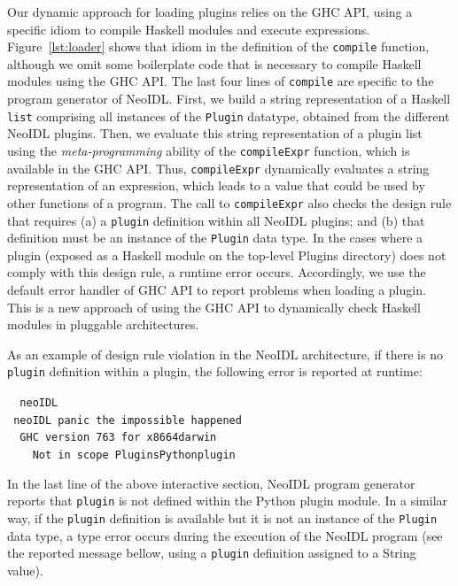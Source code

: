 \documentclass{ws-ijseke}
\newcommand{\neoidl}{NeoIDL}
\begin{document}
Our dynamic approach for loading plugins relies on the 
 GHC API, using a specific idiom to compile Haskell
 modules and execute expressions. Figure~\ref{lst:loader} shows that
 idiom in the definition of the \texttt{compile} function, although we omit some boilerplate code that is 
 necessary to compile Haskell modules using the GHC API. The last four lines of \texttt{compile} are specific to the program generator of \neoidl.
First, we build a string representation of a Haskell \texttt{list} comprising 
 all instances of the \texttt{Plugin} datatype, obtained from the
 different \neoidl{} plugins. Then, we evaluate this string
 representation of a plugin list using the \emph{meta-programming} ability
 of the \texttt{compileExpr} function, which is available in the GHC
 API. Thus, \texttt{compileExpr} dynamically evaluates a string representation of an
 expression, which leads to a value that could be used by other
 functions of a program. 
The call to \texttt{compileExpr}  
also checks the design rule that requires 
(a) a \texttt{plugin} definition
within all \neoidl{} plugins; and (b) that  
definition must be an instance of the \texttt{Plugin} data type. 
In the cases where a plugin (exposed as a Haskell module on the
top-level Plugins directory) does not comply with this design rule, 
a runtime error occurs. Accordingly, we use the default error 
handler of GHC API to report problems when loading a plugin. 
This is a new approach of using the GHC
API to dynamically check Haskell modules in pluggable architectures. 


As an example of design rule violation in the \neoidl{} architecture, 
if there is no \texttt{plugin} definition within a
plugin, the following error is reported at runtime:

\begin{tabbing}\tt
~neoIDL\\
\tt ~neoIDL~panic~the~impossible~happened\\
\tt ~~GHC~version~763~for~x8664darwin\\
\tt ~~~~Not~in~scope~PluginsPythonplugin
\end{tabbing}

In the last line of the above interactive section, 
\neoidl{} program generator reports that \texttt{plugin} is not defined within 
the Python plugin module. In a similar way, if the \texttt{plugin}
definition is available but it is not an instance of the \texttt{Plugin}
data type, a type error occurs during the execution of the \neoidl{}
program (see the reported message bellow, using a \texttt{plugin} definition
assigned to a String value). 
\end{document}
